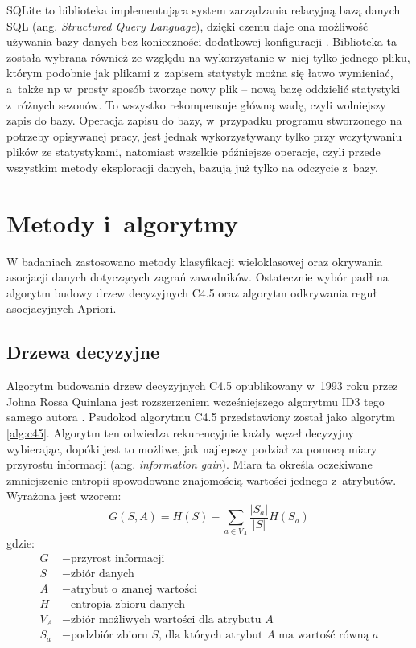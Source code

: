 \documentclass[a4paper,twoside,12pt]{book}
\newcommand{\obcy}[1]{\emph{#1}}
\renewcommand{\ang}[1]{{\selectlanguage{british}\obcy{#1}}}
\begin{document}
SQLite to biblioteka implementująca system zarządzania relacyjną bazą danych SQL (ang. \ang{Structured Query Language}), dzięki czemu daje ona możliwość używania bazy danych bez konieczności dodatkowej konfiguracji \cite{bib:sqlite, bib:sqliteEmbedding}. Biblioteka ta została wybrana również ze względu na wykorzystanie w~niej tylko jednego pliku, którym podobnie jak plikami z~zapisem statystyk można się łatwo wymieniać, a~także np w~prosty sposób tworząc nowy plik -- nową bazę oddzielić statystyki z~różnych sezonów. To wszystko rekompensuje główną wadę, czyli wolniejszy zapis do bazy. Operacja zapisu do bazy, w~przypadku programu stworzonego na potrzeby opisywanej pracy, jest jednak wykorzystywany tylko przy wczytywaniu plików ze statystykami, natomiast wszelkie późniejsze operacje, czyli przede wszystkim metody eksploracji danych, bazują już tylko na odczycie z~bazy.


\section{Metody i~algorytmy}
\label{roz:algorytmy}

W badaniach zastosowano metody klasyfikacji wieloklasowej oraz okrywania asocjacji danych dotyczących zagrań zawodników. Ostatecznie wybór padł na algorytm budowy drzew decyzyjnych C4.5 oraz algorytm odkrywania reguł asocjacyjnych Apriori.

\subsection{Drzewa decyzyjne}
\label{roz:opis-alg-drzewa}
Algorytm budowania drzew decyzyjnych C4.5 opublikowany w~1993 roku przez Johna Rossa Quinlana \cite{bib:c45} jest rozszerzeniem  wcześniejszego algorytmu ID3 tego samego autora \cite{bib:id3}. Psudokod algorytmu C4.5 przedstawiony został jako algorytm \ref{alg:c45}. Algorytm ten odwiedza rekurencyjnie każdy węzeł decyzyjny wybierając, dopóki jest to możliwe, jak najlepszy podział za pomocą miary przyrostu informacji (ang. \ang{information gain}). Miara ta określa oczekiwane zmniejszenie entropii spowodowane znajomością wartości jednego z~atrybutów. Wyrażona jest wzorem: 
\begin{equation}
\label{wz:przyrostinf}
G(S,A) = H(S) - \sum_{a \in{V_A}} \frac{|S_a|}{|S|} H(S_a)
\end{equation}
gdzie:
\begin{align*}
	G &- \text{przyrost informacji}\\
	S &- \text{zbiór danych}\\
    A &- \text{atrybut o~znanej wartości}\\
    H &- \text{entropia zbioru danych}\\
    V_A &- \text{zbiór możliwych wartości dla atrybutu $A$}\\
    S_a &- \text{podzbiór zbioru $S$, dla których atrybut $A$~ma wartość równą $a$}
\end{align*}
\end{document}

